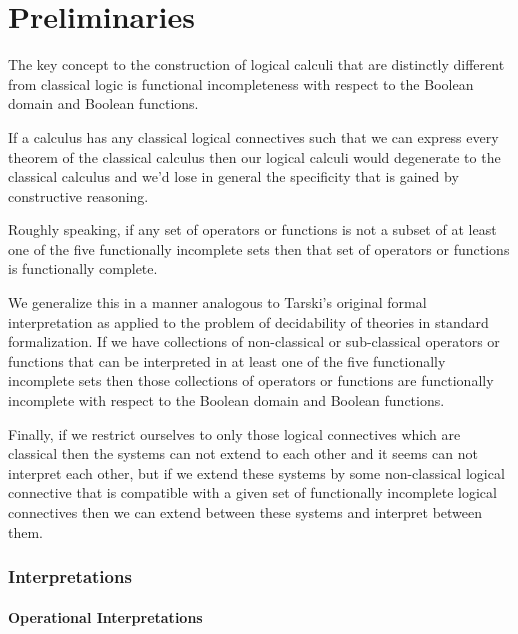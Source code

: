 \part{Preliminaries}
\begin{center}
	\begin{flushleft}
		The key concept to the construction of logical calculi that are distinctly different from classical logic is functional incompleteness with respect to the Boolean domain and Boolean functions.
	\end{flushleft}
	\begin{flushleft}
		If a calculus has any classical logical connectives such that we can express every theorem of the classical calculus then our logical calculi would degenerate to the classical calculus and we'd lose in general the specificity that is gained by constructive reasoning.
	\end{flushleft}
	\begin{flushleft}
		Roughly speaking, if any set of operators or functions is not a subset of at least one of the five functionally incomplete sets then that set of operators or functions is functionally complete.
	\end{flushleft}
	\begin{flushleft}
		We generalize this in a manner analogous to Tarski's original formal interpretation as applied to the problem of decidability of theories in standard formalization. If we have collections of non-classical or sub-classical operators or functions that can be interpreted in at least one of the five functionally incomplete sets then those collections of operators or functions are functionally incomplete with respect to the Boolean domain and Boolean functions.
	\end{flushleft}
	\begin{flushleft}
		Finally, if we restrict ourselves to only those logical connectives which are classical then the systems can not extend to each other and it seems can not interpret each other, but if we extend these systems by some non-classical logical connective that is compatible with a given set of functionally incomplete logical connectives then we can extend between these systems and interpret between them.
	\end{flushleft}
	\section{Interpretations}
		\subsection{Operational Interpretations}

\end{center}
